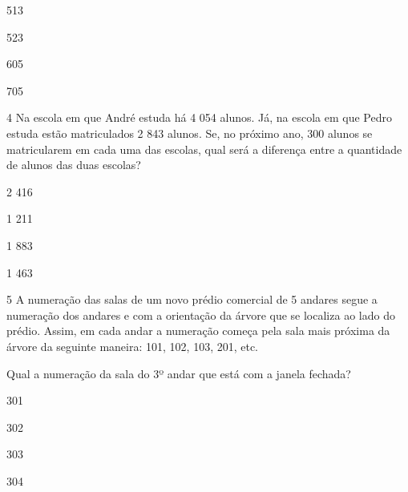 \begin{escolha}
\item
  513
\item
  523
\item
  605
\item
  705
\end{escolha}


\num{4} Na escola em que André estuda há 4 054 alunos. Já, na escola em que
Pedro estuda estão matriculados 2 843 alunos. Se, no próximo ano, 300
alunos se matricularem em cada uma das escolas, qual será a diferença
entre a quantidade de alunos das duas escolas?

\begin{escolha}
\item
  2 416
\item
  1 211
\item
  1 883
\item
  1 463
\end{escolha}


\num{5} A numeração das salas de um novo prédio comercial de 5 andares
segue a numeração dos andares e com a orientação da árvore que se
localiza ao lado do prédio. Assim, em cada andar a numeração começa pela
sala mais próxima da árvore da seguinte maneira: 101, 102, 103, 201,
etc.


Qual a numeração da sala do 3º andar que está com a janela fechada?

\begin{escolha}
\item
  301
\item
  302
\item
  303
\item
  304
\end{escolha}

